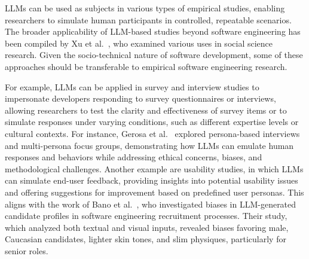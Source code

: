 LLMs can be used as subjects in various types of empirical studies, enabling researchers to simulate human participants in controlled, repeatable scenarios.
The broader applicability of LLM-based studies beyond software engineering has been compiled by Xu et al.~\cite{DBLP:journals/ipm/XuSRGPLSH24}, who examined various uses in social science research.
Given the socio-technical nature of software development, some of these approaches should be transferable to empirical software engineering research.

For example, LLMs can be applied in survey and interview studies to impersonate developers responding to survey questionnaires or interviews, allowing researchers to test the clarity and effectiveness of survey items or to simulate responses under varying conditions, such as different expertise levels or cultural contexts. For instance, Gerosa et al.~\cite{DBLP:journals/ase/GerosaTSS24} explored persona-based interviews and multi-persona focus groups, demonstrating how LLMs can emulate human responses and behaviors while addressing ethical concerns, biases, and methodological challenges.
Another example are usability studies, in which LLMs can simulate end-user feedback, providing insights into potential usability issues and offering suggestions for improvement based on predefined user personas. This aligns with the work of Bano et al.~\cite{bano2025doessoftwareengineerlook}, who investigated biases in LLM-generated candidate profiles in software engineering recruitment processes. Their study, which analyzed both textual and visual inputs, revealed biases favoring male, Caucasian candidates, lighter skin tones, and slim physiques, particularly for senior roles.



